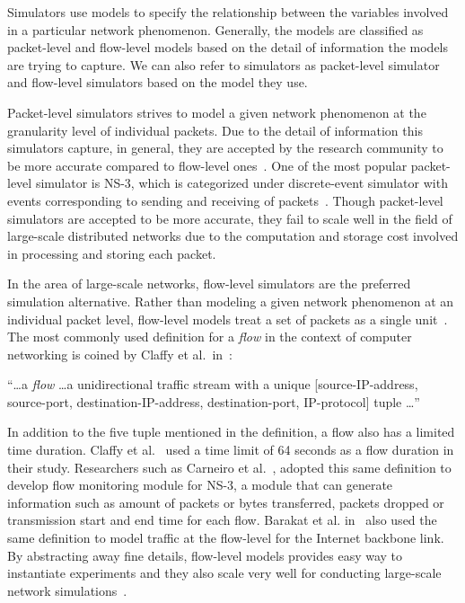 Simulators use models to specify the relationship between the variables involved in a particular network phenomenon. Generally, the models are classified as packet-level and flow-level models based on the detail of information the models are trying to capture. We can also refer to simulators as packet-level simulator and flow-level simulators based on the model they use. 

Packet-level simulators strives to model a given network phenomenon at the granularity level of individual packets. Due to the detail of information this simulators capture, in general, they are accepted by the research community to be more accurate compared to flow-level ones~\cite{DBLP:journals/jpdc/CasanovaGLQS14}. One of the most popular packet-level simulator is NS-3, which is categorized under discrete-event simulator with events corresponding to sending and receiving of packets~\cite{ns3}. Though packet-level simulators are accepted to be more accurate, they fail to scale well in the field of large-scale distributed networks due to the computation and storage cost involved in processing and storing each packet. 

In the area of large-scale networks, flow-level simulators are the preferred simulation alternative. Rather than modeling a given network phenomenon at an individual packet level, flow-level models treat a set of packets as a single unit~\cite{DBLP:journals/jpdc/CasanovaGLQS14}. The most commonly used definition for a \emph{flow} in the context of computer networking is coined by Claffy et al.~in~\cite{claffy1998nature}: 

``\ldots a \emph{flow} \ldots a unidirectional traffic stream with a unique [source-IP-address, source-port, destination-IP-address, destination-port, IP-protocol] tuple \ldots''

In addition to the five tuple mentioned in the definition, a flow also has a limited time duration. Claffy et al.~\cite{claffy1998nature} used a time limit of 64 seconds as a flow duration in their study. Researchers such as Carneiro et al.~\cite{DBLP:conf/valuetools/CarneiroFR09}, adopted this same definition to develop flow monitoring module for NS-3, a module that can generate information such as amount of packets or bytes transferred, packets dropped or transmission start and end time for each flow. Barakat et al. in~\cite{DBLP:journals/tsp/BarakatTIDO03} also used the same definition to model traffic at the flow-level for the Internet backbone link. By abstracting away fine details, flow-level models provides easy way to instantiate experiments and they also scale very well for conducting large-scale network simulations~\cite{DBLP:journals/jpdc/CasanovaGLQS14,DBLP:journals/tsp/BarakatTIDO03}.

